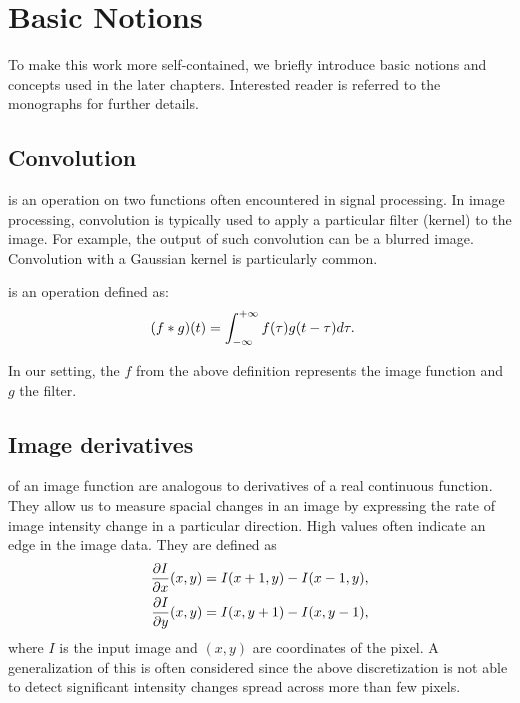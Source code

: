 \chapter{Basic Notions} 
\label{chap:notions}

To make this work more self-contained, we briefly introduce basic notions and concepts used in the later chapters. 
Interested reader is referred to the monographs \cite{szeliski2010, multipleview} for further details.

\section{Convolution}

 is an operation on two functions often encountered in signal processing.
In image processing, convolution is typically used to apply a particular filter (kernel) to the image.
For example, the output of such convolution can be a blurred image. 
Convolution with a Gaussian kernel is particularly common. 
\begin{definition}
 is an operation defined as:
\begin{align*}
(f * g)(t)&=\int_{-\infty}^{+\infty} f(\tau)g(t -\tau) d\tau.
\end{align*}
\end{definition} 
In our setting, the $f$ from the above definition represents the image function and $g$ the filter.

\section{Image derivatives}
\label{sec:imder}
 of an image function are analogous to derivatives of a real continuous function.
They allow us to measure spacial changes in an image by expressing the rate of image intensity change in a particular direction. 
High values often indicate an edge in the image data. 
They are defined as
\begin{align*}
\frac{ \partial I }{ \partial x }(x, y)& = I(x + 1, y) - I(x-1, y), \\
\frac{ \partial I }{ \partial y }(x, y)& = I(x, y + 1) - I(x, y - 1),
\end{align*}
where $I$ is the input image and $(x, y)$ are coordinates of the pixel.
A generalization of this is often considered since the above discretization is not able to detect significant intensity changes spread across more than few pixels. 

